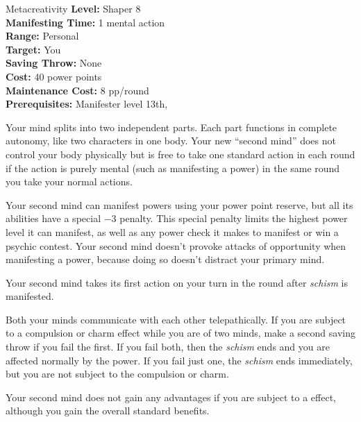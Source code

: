 {Metacreativity}
{
	\textbf{Level:}
	Shaper 8\\
	\textbf{Manifesting Time:}
	1 mental action\\
	\textbf{Range:}
	Personal\\
	\textbf{Target:}
	You\\
	\textbf{Saving Throw:}
	None\\
	\textbf{Cost:}
	40 power points\\
	\textbf{Maintenance Cost:}
	8 pp/round\\
	\textbf{Prerequisites:}
	Manifester level 13th, \\
}
{
	Your mind splits into two independent parts. Each part functions in complete autonomy, like two characters in one body. Your new ``second mind'' does not control your body physically but is free to take one standard action in each round if the action is purely mental (such as manifesting a power) in the same round you take your normal actions.

	Your second mind can manifest powers using your power point reserve, but all its abilities have a special $-3$ penalty. This special penalty limits the highest power level it can manifest, as well as any power check it makes to manifest or win a psychic contest. Your second mind doesn't provoke attacks of opportunity when manifesting a power, because doing so doesn't distract your primary mind.

	Your second mind takes its first action on your turn in the round after \emph{schism} is manifested.

	Both your minds communicate with each other telepathically. If you are subject to a compulsion or charm effect while you are of two minds, make a second saving throw if you fail the first. If you fail both, then the \emph{schism} ends and you are affected normally by the power. If you fail just one, the \emph{schism} ends immediately, but you are not subject to the compulsion or charm.

	Your second mind does not gain any advantages if you are subject to a  effect, although you gain the overall standard benefits.
}